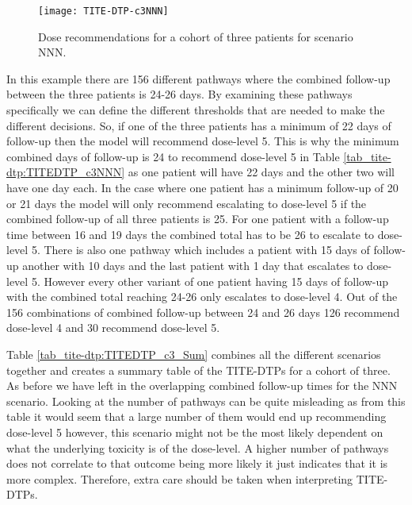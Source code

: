 \begin{figure}[H]
	\centering
	\caption{Dose recommendations for a cohort of three patients for scenario NNN.}
	\label{fig_tite-dtp:c3NNNprob}
	\texttt{[image: TITE-DTP-c3NNN]}
\end{figure}

In this example there are 156 different pathways where the combined follow-up between the three patients is 24-26 days. By examining these pathways specifically we can define the different thresholds that are needed to make the different decisions. So, if one of the three patients has a minimum of 22 days of follow-up then the model will recommend dose-level 5. This is why the minimum combined days of follow-up is 24 to recommend dose-level 5 in Table \ref{tab_tite-dtp:TITEDTP_c3NNN} as one patient will have 22 days and the other two will have one day each. In the case where one patient has a minimum follow-up of 20 or 21 days the model will only recommend escalating to dose-level 5 if the combined follow-up of all three patients is 25. For one patient with a follow-up time between 16 and 19 days the combined total has to be 26 to escalate to dose-level 5. There is also one pathway which includes a patient with 15 days of follow-up another with 10 days and the last patient with 1 day that escalates to dose-level 5. However every other variant of one patient having 15 days of follow-up with the combined total reaching 24-26 only escalates to dose-level 4. Out of the 156 combinations of combined follow-up between 24 and 26 days 126 recommend dose-level 4 and 30 recommend dose-level 5. 

Table \ref{tab_tite-dtp:TITEDTP_c3_Sum} combines all the different scenarios together and creates a summary table of the TITE-DTPs for a cohort of three. As before we have left in the overlapping combined follow-up times for the NNN scenario. Looking at the number of pathways can be quite misleading as from this table it would seem that a large number of them would end up recommending dose-level 5 however, this scenario might not be the most likely dependent on what the underlying toxicity is of the dose-level. A higher number of pathways does not correlate to that outcome being more likely it just indicates that it is more complex. Therefore, extra care should be taken when interpreting TITE-DTPs. 

